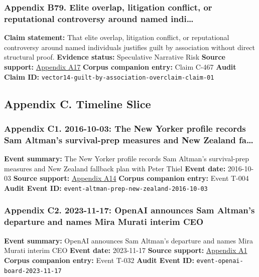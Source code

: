 \documentclass[
  american,
  11pt,
  letterpaper,
]{article}
\begin{document}
\subsubsection{Appendix B79. Elite overlap, litigation conflict, or
reputational controversy around named
indi\ldots{}}\label{ch-08-appendix-b79-elite-overlap-litigation-conflict-or-reputational-controversy-around-named-indi}

\textbf{Claim statement:} That elite overlap, litigation conflict, or
reputational controversy around named individuals justifies guilt by
association without direct structural proof. \textbf{Evidence status:}
Speculative Narrative Risk \textbf{Source support:}
\hyperref[ch-08-appendix-a17-musk-v-altman-4-24-cv-04722]{Appendix A17}
\textbf{Corpus companion entry:} Claim C-467 \textbf{Audit Claim ID:}
\texttt{vector14-guilt-by-association-overclaim-claim-01}

\subsection{Appendix C. Timeline
Slice}\label{appendix-c.-timeline-slice-8}

\subsubsection{Appendix C1. 2016-10-03: The New Yorker profile records
Sam Altman's survival-prep measures and New Zealand
fa\ldots{}}\label{ch-08-appendix-c1-2016-10-03-the-new-yorker-profile-records-sam-altman-s-survival-prep-measures-and-new-zealand-fallback-plan-with-peter-thiel}

\textbf{Event summary:} The New Yorker profile records Sam Altman's
survival-prep measures and New Zealand fallback plan with Peter Thiel
\textbf{Event date:} 2016-10-03 \textbf{Source support:}
\hyperref[ch-08-appendix-a14-sam-altman-s-manifest-destiny]{Appendix
A14} \textbf{Corpus companion entry:} Event T-004 \textbf{Audit Event
ID:} \texttt{event-altman-prep-new-zealand-2016-10-03}

\subsubsection{Appendix C2. 2023-11-17: OpenAI announces Sam Altman's
departure and names Mira Murati interim
CEO}\label{ch-08-appendix-c2-2023-11-17-openai-announces-sam-altmans-departure-and-names-mira-murati-interim-ceo}

\textbf{Event summary:} OpenAI announces Sam Altman's departure and
names Mira Murati interim CEO \textbf{Event date:} 2023-11-17
\textbf{Source support:}
\hyperref[ch-08-appendix-a1-openai-announces-leadership-transition]{Appendix
A1} \textbf{Corpus companion entry:} Event T-032 \textbf{Audit Event
ID:} \texttt{event-openai-board-2023-11-17}
\end{document}
